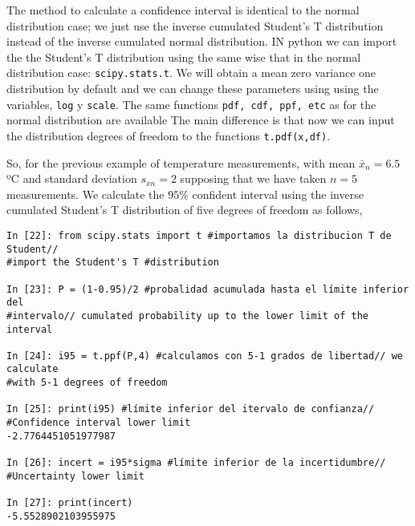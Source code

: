 \begin{paracol}{2}
The method to calculate a confidence interval is identical to the normal distribution case; we just use the inverse cumulated Student's T distribution instead of the inverse cumulated normal distribution. IN python we can import the the Student's T distribution using the same wise that in the normal distribution case: \texttt{scipy.stats.t}. We will obtain a mean zero variance one distribution by default and we can change these parameters using using the variables, \texttt{log} y \texttt{scale}. The same functions \texttt{pdf, cdf, ppf, etc} as for the normal distribution are available The main difference  is that now we can input the distribution degrees of freedom to the functions \texttt{t.pdf(x,df)}. 

So, for the previous example of temperature measurements, with mean $\bar{x}_n=6.5$ ºC and standard deviation $s_{xn}=2$ supposing that we have taken $n=5$ measurements. We calculate the $95\%$ confident interval using the inverse cumulated Student's T distribution of five degrees of freedom as follows,
\end{paracol}

\begin{verbatim}
In [22]: from scipy.stats import t #importamos la distribucion T de Student//
#import the Student's T #distribution

In [23]: P = (1-0.95)/2 #probalidad acumulada hasta el límite inferior del 
#intervalo// cumulated probability up to the lower limit of the interval

In [24]: i95 = t.ppf(P,4) #calculamos con 5-1 grados de libertad// we calculate 
#with 5-1 degrees of freedom

In [25]: print(i95) #límite inferior del itervalo de confianza// 
#Confidence interval lower limit 
-2.7764451051977987

In [26]: incert = i95*sigma #límite inferior de la incertidumbre//
#Uncertainty lower limit

In [27]: print(incert)
-5.5528902103955975
\end{verbatim}

